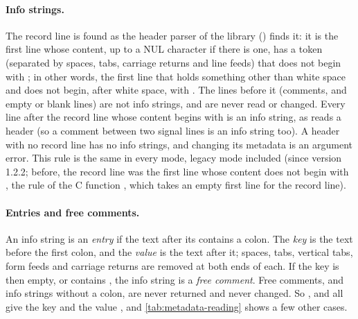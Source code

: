 \paragraph{Info strings.} The record line is found as the header parser of
the library () finds it: it is the first line whose
content, up to a NUL character if there is one, has a token (separated by
spaces, tabs, carriage returns and line feeds) that does not begin with
\code{\#}; in other words, the first line that holds something other than
white space and does not begin, after white space, with \code{\#}. The
lines before it (comments, and empty or blank lines) are not info strings,
and are never read or changed. Every line after the record line whose
content begins with \code{\#} is an info string, as  reads a
header (so a comment between two signal lines is an info string too). A
header with no record line has no info strings, and changing its metadata is
an argument error. This rule is the same in
every mode, legacy mode included (since version 1.2.2; before, the record
line was the first line whose content does not begin with \code{\#}, the
rule of the C function , which takes an empty first line for
the record line).

\paragraph{Entries and free comments.} An info string is an \emph{entry} if
the text after its \code{\#} contains a colon. The \emph{key} is the text
before the first colon, and the \emph{value} is the text after it; spaces,
tabs, vertical tabs, form feeds and carriage returns are removed at both ends
of each. If the key is then empty, or contains \code{\#}, the info string is
a \emph{free comment}. Free comments, and info strings without a colon, are
never returned and never changed. So ,  and
 all give the key  and the value , and
\cref{tab:metadata-reading} shows a few other cases.

